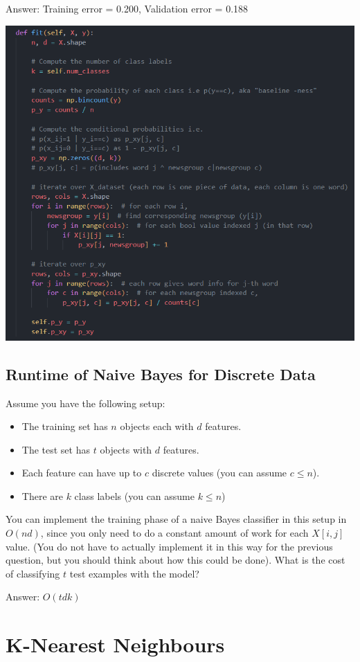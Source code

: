 \documentclass{article}
\def\ans#1{\par\gre{Answer: #1}}
\def\blu#1{{\color{blu}#1}}
\def\gre#1{{\color{gre}#1}}
\def\items#1{\begin{itemize}#1\end{itemize}}
\begin{document}
	\ans {Training error = 0.200, Validation error = 0.188}
	
	\includegraphics[scale=1.9]{1.3.png}

\pagebreak

\subsection{Runtime of Naive Bayes for Discrete Data}

Assume you have the following setup:
\items{
\item The training set has $n$ objects each with $d$ features.
\item The test set has $t$ objects with $d$ features.
\item Each feature can have up to $c$ discrete values (you can assume $c \leq n$).
\item There are $k$ class labels (you can assume $k \leq n$)
}
You can implement the training phase of a naive Bayes classifier in this setup in $O(nd)$, since you only need to do a constant amount of work for each $X[i,j]$ value. (You do not have to actually implement it in this way for the previous question, but you should think about how this could be done). \blu{What is the cost of classifying $t$ test examples with the model?}

\ans {$O(tdk)$}


\pagebreak

\section{K-Nearest Neighbours}
\end{document}
